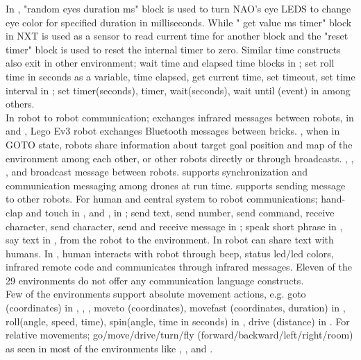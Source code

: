 In \openroberta, "random eyes duration ms" block is used to turn NAO's eye LEDS to change eye color for specified duration in milliseconds. While " get value ms timer" block in NXT is used as a sensor to read current time for another block and the "reset timer" block is used to reset the internal timer to zero. Similar time constructs also exit in other environment; wait time and elapsed time blocks in \ardublockly; set roll time in seconds as a variable, time elapsed, get current time, set timeout, set time interval in \sphero; set timer(seconds), timer, wait(seconds), wait until (event) in \vex among others. \\
 In robot to robot communication; \edison exchanges infrared messages between robots, in \lego and \openroberta, Lego Ev3 robot exchanges Bluetooth messages between bricks. \missionlab, when in GOTO state, robots share information about target goal position and map of the environment among each other, or other robots directly or through broadcasts. \sphero, \vex, \makeblock, and \tello broadcast message between robots. \flyaq supports synchronization and communication messaging among drones at run time.  \trik supports sending message to other robots. For human and central system to robot communications; hand-clap and touch in \aseba, and \enchanting, in \blocklyprop; send text, send number, send command, receive character, send character, send and receive message in \tello; speak short phrase in \codelab, say text in \trik, \tivipe from the robot to the environment. In \choregraphe robot can share text with humans. In \arcbotics, human interacts with robot through beep, status led/led colors, infrared remote code and \picaxe communicates through infrared messages. Eleven of the 29 environments do not offer any communication language constructs. \\
 Few of the environments support absolute movement actions, e.g. goto (coordinates) in \flyaq, \missionlab, \makeblock, moveto (coordinates), movefast (coordinates, duration) in \tivipe, roll(angle, speed, time), spin(angle, time in seconds) in \sphero, drive (distance) in \codelab. For relative movements; go/move/drive/turn/fly (forward/backward/left/right/room) as seen in most of the environments like \metabot, \trik, and \lego.

